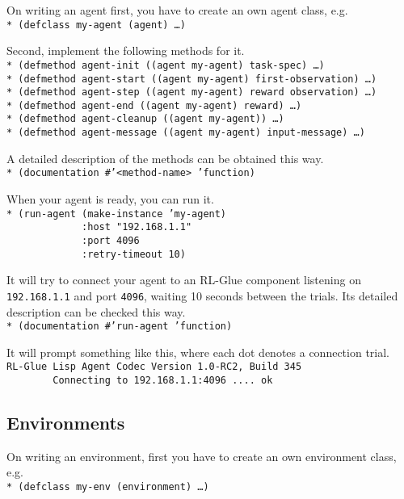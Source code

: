 \documentclass[11pt,a4paper,dvipdfm]{article}
\newcommand{\prompttext}[1]{\texttt{#1}}
\newcommand{\lispprompt}[1]{\prompttext{* #1}}
\begin{document}
On writing an agent first, you have to create an own agent class, e.g. \\
\lispprompt{(defclass my-agent (agent) \ldots)}

Second, implement the following methods for it. \\
\lispprompt{(defmethod agent-init ((agent my-agent) task-spec) \ldots)} \\
\lispprompt{(defmethod agent-start ((agent my-agent) first-observation) \ldots)} \\
\lispprompt{(defmethod agent-step ((agent my-agent) reward observation) \ldots)} \\
\lispprompt{(defmethod agent-end ((agent my-agent) reward) \ldots)} \\
\lispprompt{(defmethod agent-cleanup ((agent my-agent)) \ldots)} \\
\lispprompt{(defmethod agent-message ((agent my-agent) input-message) \ldots)}

A detailed description of the methods can be obtained this way. \\
\lispprompt{(documentation \#'<method-name> 'function)}

When your agent is ready, you can run it. \\
\lispprompt{(run-agent (make-instance 'my-agent) \\
\mbox{~~~~~~~~~~~~~}:host "192.168.1.1" \\
\mbox{~~~~~~~~~~~~~}:port 4096 \\
\mbox{~~~~~~~~~~~~~}:retry-timeout 10)}

It will try to connect your agent to an RL-Glue component listening on
\prompttext{192.168.1.1} and port \prompttext{4096}, waiting 10 seconds
between the trials. Its detailed description can be checked this way. \\
\lispprompt{(documentation \#'run-agent 'function)}

It will prompt something like this, where each dot denotes a connection
trial. \\
\prompttext{RL-Glue Lisp Agent Codec Version 1.0-RC2, Build 345} \\
\prompttext{\mbox{~~~~~~~~}Connecting to 192.168.1.1:4096 ....~ok}

\subsection{Environments}

On writing an environment, first you have to create an own environment class,
e.g. \\
\lispprompt{(defclass my-env (environment) \ldots)}
\end{document}
